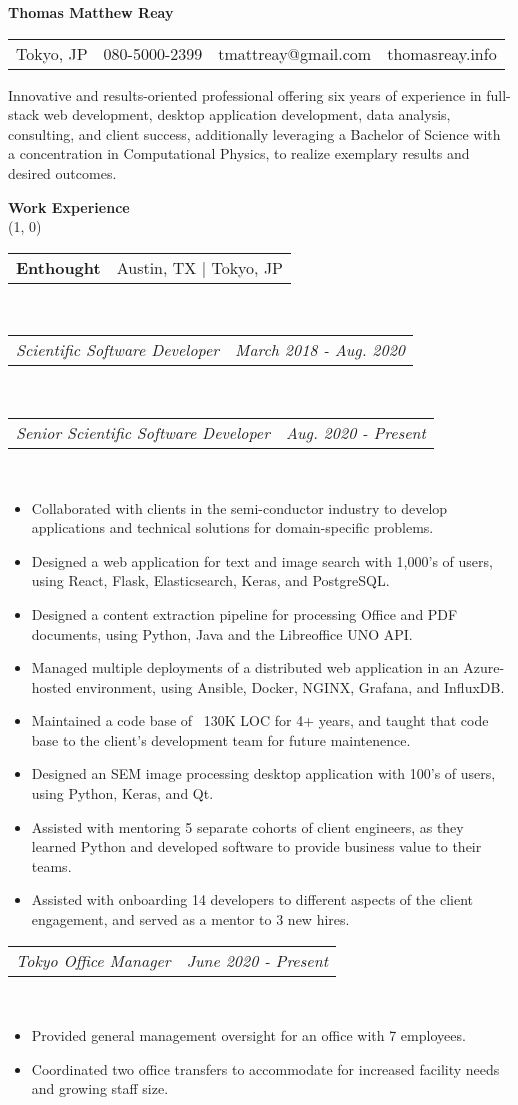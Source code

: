 \documentclass{article}
\makeatletter
\newcommand{\heading}[1]{
	\vspace{2em}
	\textbf{\large #1} \\
	\line(1, 0){\textwidth}
	\vspace{-0.5em}
}
\newcommand{\subheading}[2]{
	\begin{tabular*}{\textwidth}{l@{\extracolsep{\fill}}r}
		\textbf{#1} & #2 \\
	\end{tabular*} \\
}
\newcommand{\itemheading}[2]{
	\vspace{0.2em}
	\begin{tabular*}{\textwidth}{l@{\extracolsep{\fill}}r}
		\textit{#1} & \textit{#2} \\
	\end{tabular*} \\
	\vspace{-0.5em}
}
\makeatother
\begin{document}
\textbf{\huge Thomas Matthew Reay}

\vspace{1em}

\begin{tabular*}{\textwidth}{l|l|l|l}
	\hline
	Tokyo, JP & 080-5000-2399 & tmattreay@gmail.com & thomasreay.info
	\rule{0em}{1.25em} \\
\end{tabular*}

\vspace{1em}

Innovative and results-oriented professional offering six years of experience
in full-stack web development, desktop application development, data analysis,
consulting, and client success, additionally leveraging a Bachelor of Science
with a concentration in Computational Physics, to realize exemplary results and
desired outcomes.

\heading{Work Experience}

\subheading{Enthought}{Austin, TX | Tokyo, JP}
\itemheading{Scientific Software Developer}{March 2018 - Aug. 2020}
\vspace{0.5em}
\itemheading{Senior Scientific Software Developer}{Aug. 2020 - Present}
\begin{itemize}
	\item Collaborated with clients in the semi-conductor industry to develop
	      applications and technical solutions for domain-specific problems.
	\item Designed a web application for text and image search with 1,000's of
	      users, using React, Flask, Elasticsearch, Keras, and PostgreSQL.
	\item Designed a content extraction pipeline for processing Office and PDF
	      documents, using Python, Java and the Libreoffice UNO API.
	\item Managed multiple deployments of a distributed web application in an
	      Azure-hosted environment, using Ansible, Docker, NGINX, Grafana, and
		  InfluxDB.
	\item Maintained a code base of ~130K LOC for 4+ years, and taught that
	      code base to the client's development team for future maintenence.
	\item Designed an SEM image processing desktop application with 100's of
	      users, using Python, Keras, and Qt.
	\item Assisted with mentoring 5 separate cohorts of client engineers, as
		  they learned Python and developed software to provide business value
		  to their teams.
	\item Assisted with onboarding 14 developers to different aspects of the
	      client engagement, and served as a mentor to 3 new hires.
\end{itemize}
\itemheading{Tokyo Office Manager}{June 2020 - Present}
\begin{itemize}
	\item Provided general management oversight for an office with 7
		  employees.
	\item Coordinated two office transfers to accommodate for increased
		  facility needs and growing staff size.
\end{itemize}
\end{document}
